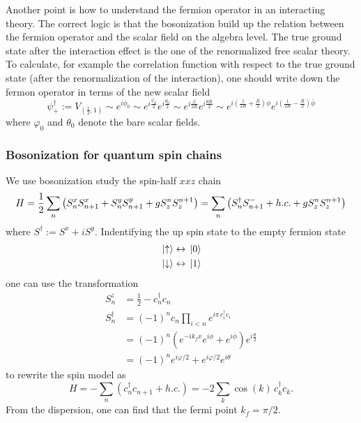 Another point is how to understand the fermion operator in an interacting theory. The correct logic is that the bosonization build up the relation between the fermion operator and the scalar field on the algebra level. The true ground state after the interaction effect is the one of the renormalized free scalar theory. To calculate, for example the correlation function with respect to the true ground state (after the renormalization of the interaction), one should write down the fermon operator in terms of the new scalar field 
\begin{equation}
	\psi_{+}^\dagger := V_{(\frac{1}{2},1)}\sim e^{i\phi_0} \sim e^{i\frac{\varphi_0}{2}} e^{i\frac{\theta_0}{2}} \sim e^{i\frac{\varphi}{2R}}e^{i\frac{\theta R}{2}} \sim e^{i\left(\frac{1}{2R}+\frac{R}{2}\right)\phi}e^{i\left(\frac{1}{2R}-\frac{R}{2}\right)\bar{\phi}}
\end{equation} 
where $\varphi_0$ and $\theta_0$ denote the bare scalar fields.


\subsubsection{Bosonization for quantum spin chains}
We use bosonization study the spin-half $xxz$ chain
\begin{equation}
	H = \frac{1}{2}\sum_n \left(S_n^x S_{n+1}^x + S_n^y S_{n+1}^y + g S^{n}_{z} S^{n+1}_{z} \right) = \sum_n \left(S^\dagger_n S^{-}_{n+1} + h.c. + g S^{n}_{z} S^{n+1}_{z} \right)
\end{equation}
where $S^\dagger := S^x + i S^y$. Indentifying the up spin state to the empty fermion state
\begin{equation}
	\begin{aligned}
		&\ket*{\uparrow} \leftrightarrow \ket*{0}\\
		&\ket*{\downarrow} \leftrightarrow \ket*{1}
	\end{aligned}
\end{equation}
one can use the transformation
\begin{equation}
	\begin{aligned}
		S_n^z &= \frac{1}{2} - c_n^\dagger c_n \\
		S_n^\dagger &= \left(-1\right)^n c_n \prod_{i<n}e^{i\pi\,c_i^\dagger c_i} \\
		&= (-1)^n \left( e^{-ik_f x} e^{i\phi} + e^{i\overline{\phi}}\right) e^{i\frac{\theta}{2}} \\
		&= (-1)^n e^{i\varphi/2} + e^{i\varphi/2} e^{i\theta}
	\end{aligned}
\end{equation}
to rewrite the spin model as 
\begin{equation}
	H = -\sum_n \left(c_n^\dagger c_{n+1} + h.c.\right) = -2\sum_k \cos(k)\,c_k^\dagger c_k.
\end{equation}
From the dispersion, one can find that the fermi point $k_f = \pi/2$. 

